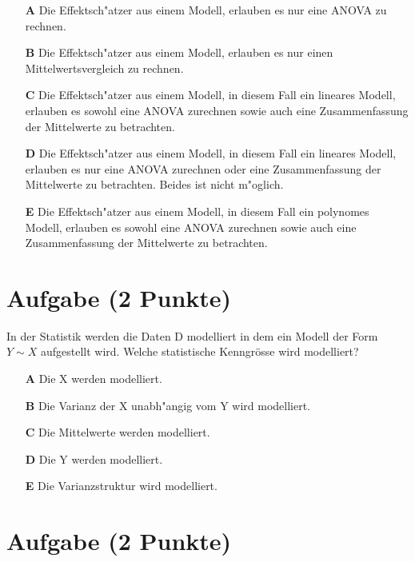\documentclass[a4paper, 10pt]{scrartcl}\usepackage[]{graphicx}\usepackage[]{xcolor}
\begin{document}
\begin{enumerate}
\item [\textbf{A} \msquare] Die Effektsch{"a}tzer aus einem Modell, erlauben es nur eine ANOVA zu rechnen. 
\item [\textbf{B} \msquare] Die Effektsch{"a}tzer aus einem Modell, erlauben es nur einen Mittelwertsvergleich zu rechnen.
\item [\textbf{C} \msquare] Die Effektsch{"a}tzer aus einem Modell, in diesem Fall ein lineares Modell, erlauben es sowohl eine ANOVA zurechnen sowie auch eine Zusammenfassung der Mittelwerte zu betrachten.
\item [\textbf{D} \msquare] Die Effektsch{"a}tzer aus einem Modell, in diesem Fall ein lineares Modell, erlauben es nur eine ANOVA zurechnen oder eine Zusammenfassung der Mittelwerte zu betrachten. Beides ist nicht m{"o}glich.
\item [\textbf{E} \msquare] Die Effektsch{"a}tzer aus einem Modell, in diesem Fall ein polynomes Modell, erlauben es sowohl eine ANOVA zurechnen sowie auch eine Zusammenfassung der Mittelwerte zu betrachten.
\end{enumerate}

\section{Aufgabe \hfill (2 Punkte)}

In der Statistik werden die Daten D modelliert in dem ein Modell der Form
$Y \sim X$ aufgestellt wird. Welche statistische Kenngr{\"o}sse wird modelliert? 



\begin{enumerate}
\item [\textbf{A} \msquare] Die X werden modelliert.
\item [\textbf{B} \msquare] Die Varianz der X unabh{"a}ngig vom Y wird modelliert.
\item [\textbf{C} \msquare] Die Mittelwerte werden modelliert.
\item [\textbf{D} \msquare] Die Y werden modelliert.
\item [\textbf{E} \msquare] Die Varianzstruktur wird modelliert.
\end{enumerate}

\section{Aufgabe \hfill (2 Punkte)}
\end{document}
